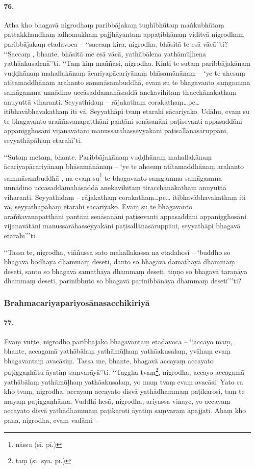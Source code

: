 \paragraph{76.} Atha kho bhagavā nigrodhaṃ paribbājakaṃ tuṇhībhūtaṃ maṅkubhūtaṃ pattakkhandhaṃ adhomukhaṃ pajjhāyantaṃ appaṭibhānaṃ viditvā nigrodhaṃ paribbājakaṃ etadavoca – ‘‘saccaṃ kira, nigrodha, bhāsitā te esā vācā’’ti? ‘‘Saccaṃ , bhante, bhāsitā me esā vācā, yathābālena yathāmūḷhena yathāakusalenā’’ti. ‘‘Taṃ kiṃ maññasi, nigrodha. Kinti te sutaṃ paribbājakānaṃ vuḍḍhānaṃ mahallakānaṃ ācariyapācariyānaṃ bhāsamānānaṃ – ‘ye te ahesuṃ atītamaddhānaṃ arahanto sammāsambuddhā, evaṃ su te bhagavanto saṃgamma samāgamma unnādino uccāsaddamahāsaddā anekavihitaṃ tiracchānakathaṃ anuyuttā viharanti. Seyyathidaṃ – rājakathaṃ corakathaṃ…pe… itibhavābhavakathaṃ iti vā. Seyyathāpi tvaṃ etarahi sācariyako. Udāhu, evaṃ su te bhagavanto araññavanapatthāni pantāni senāsanāni paṭisevanti appasaddāni appanigghosāni vijanavātāni manussarāhasseyyakāni paṭisallānasāruppāni, seyyathāpāhaṃ etarahī’ti.

‘‘Sutaṃ metaṃ, bhante. Paribbājakānaṃ vuḍḍhānaṃ mahallakānaṃ ācariyapācariyānaṃ bhāsamānānaṃ – ‘ye te ahesuṃ atītamaddhānaṃ arahanto sammāsambuddhā , na evaṃ su\footnote{nāssu (sī. pī.)} te bhagavanto saṃgamma samāgamma unnādino uccāsaddamahāsaddā anekavihitaṃ tiracchānakathaṃ anuyuttā viharanti. Seyyathidaṃ – rājakathaṃ corakathaṃ…pe… itibhavābhavakathaṃ iti vā, seyyathāpāhaṃ etarahi sācariyako. Evaṃ su te bhagavanto araññavanapatthāni pantāni senāsanāni paṭisevanti appasaddāni appanigghosāni vijanavātāni manussarāhasseyyakāni paṭisallānasāruppāni, seyyathāpi bhagavā etarahī’’’ti.

‘‘Tassa te, nigrodha, viññussa sato mahallakassa na etadahosi – ‘buddho so bhagavā bodhāya dhammaṃ deseti, danto so bhagavā damathāya dhammaṃ deseti, santo so bhagavā samathāya dhammaṃ deseti, tiṇṇo so bhagavā taraṇāya dhammaṃ deseti, parinibbuto so bhagavā parinibbānāya dhammaṃ desetī’’’ti?

\subsubsection{Brahmacariyapariyosānasacchikiriyā}

\paragraph{77.} Evaṃ vutte, nigrodho paribbājako bhagavantaṃ etadavoca – ‘‘accayo maṃ, bhante, accagamā yathābālaṃ yathāmūḷhaṃ yathāakusalaṃ, yvāhaṃ evaṃ bhagavantaṃ avacāsiṃ. Tassa me, bhante, bhagavā accayaṃ accayato paṭiggaṇhātu āyatiṃ saṃvarāyā’’ti. ‘‘Taggha tvaṃ\footnote{taṃ (sī. syā. pī.)}, nigrodha, accayo accagamā yathābālaṃ yathāmūḷhaṃ yathāakusalaṃ, yo maṃ tvaṃ evaṃ avacāsi. Yato ca kho tvaṃ, nigrodha, accayaṃ accayato disvā yathādhammaṃ paṭikarosi, taṃ te mayaṃ paṭiggaṇhāma. Vuddhi hesā, nigrodha, ariyassa vinaye, yo accayaṃ accayato disvā yathādhammaṃ paṭikaroti āyatiṃ saṃvaraṃ āpajjati. Ahaṃ kho pana, nigrodha, evaṃ vadāmi –

